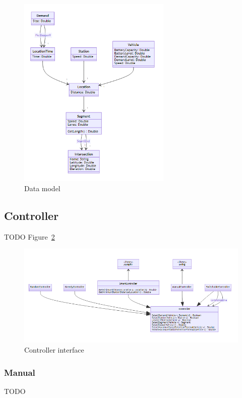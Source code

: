 \documentclass{article}
\begin{document}
    \begin{figure}
        \centering
        \includegraphics[width=0.65\textwidth,angle=90]{../../diagrams/model/classes-v0.png}
        \caption{Data model}
        \label{fig:1}
    \end{figure}

    \subsection{Controller}
    TODO Figure~\ref{fig:2}

    \begin{figure}
        \centering
        \includegraphics[width=\textwidth]{../../diagrams/controller/classes.png}
        \caption{Controller interface}
        \label{fig:2}
    \end{figure}

    \subsubsection{Manual}
    TODO
\end{document}
